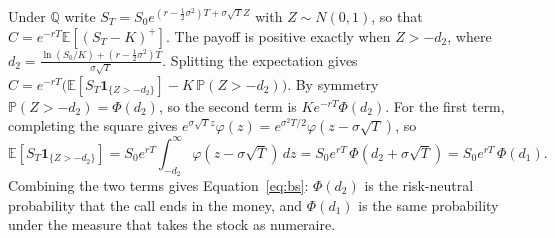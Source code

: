 Under $\mathbb Q$ write $S_T=S_0e^{(r-\frac12\sigma^2)T+\sigma\sqrt TZ}$ with $Z\sim N(0,1)$, so that $C=e^{-rT}\mathbb E[(S_T-K)^+]$.
The payoff is positive exactly when $Z>-d_2$, where $d_2=\frac{\ln(S_0/K)+(r-\frac12\sigma^2)T}{\sigma\sqrt T}$.
Splitting the expectation gives $C=e^{-rT}\big(\mathbb E[S_T\mathbf 1_{\{Z>-d_2\}}]-K\,\mathbb P(Z>-d_2)\big)$.
By symmetry $\mathbb P(Z>-d_2)=\Phi(d_2)$, so the second term is $Ke^{-rT}\Phi(d_2)$.
For the first term, completing the square gives $e^{\sigma\sqrt Tz}\varphi(z)=e^{\sigma^2T/2}\varphi(z-\sigma\sqrt T)$, so
\begin{equation}
 \mathbb E[S_T\mathbf 1_{\{Z>-d_2\}}]=S_0e^{rT}\int_{-d_2}^{\infty}\varphi(z-\sigma\sqrt T)\,dz=S_0e^{rT}\,\Phi(d_2+\sigma\sqrt T)=S_0e^{rT}\,\Phi(d_1).
\end{equation}
Combining the two terms gives Equation~\eqref{eq:bs}: $\Phi(d_2)$ is the risk-neutral probability that the call ends in the money, and $\Phi(d_1)$ is the same probability under the measure that takes the stock as numeraire.

